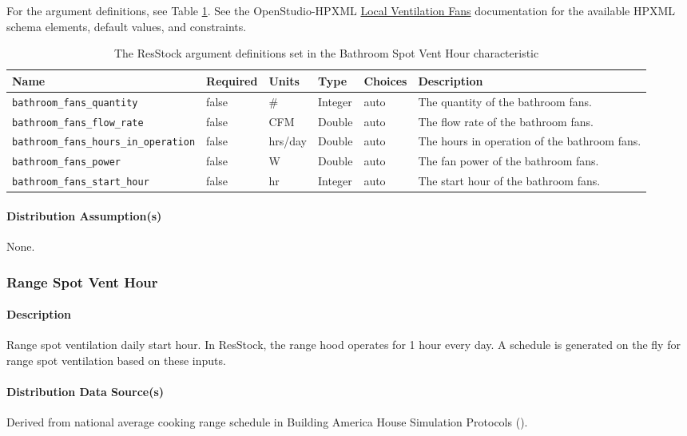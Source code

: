 For the argument definitions, see Table \ref{table:hc_arg_def_bath_vent}. See the OpenStudio-HPXML \href{https://openstudio-hpxml.readthedocs.io/en/v1.8.1/workflow_inputs.html#hpxml-local-ventilation-fans}{Local Ventilation Fans} documentation for the available HPXML schema elements, default values, and constraints.

\begin{longtable}[]{|p{3.5cm}|p{1.5cm}|p{1.3cm}|p{1.1cm}|p{}|p{3.3cm}|} \caption{The ResStock argument definitions set in the Bathroom Spot Vent Hour characteristic} \label{table:hc_arg_def_bath_vent}\\
\toprule\noalign{}
Name & Required & Units & Type & Choices & Description \\
\midrule\noalign{}
\endhead
\bottomrule\noalign{}
\endlastfoot
\texttt{bathroom\_fans\_quantity} & false & \# & Integer & auto & The
quantity of the bathroom fans.  \\
\hline
\texttt{bathroom\_fans\_flow\_rate} & false & CFM & Double & auto & The
flow rate of the bathroom fans.  \\
\hline
\texttt{bathroom\_fans\_hours\_in\_operation} & false & hrs/day & Double
& auto & The hours in operation of the bathroom fans.  \\
\hline
\texttt{bathroom\_fans\_power} & false & W & Double & auto & The fan
power of the bathroom fans. \\
\hline
\texttt{bathroom\_fans\_start\_hour} & false & hr & Integer & auto & The
start hour of the bathroom fans.  \\
\end{longtable}

\paragraph{Distribution Assumption(s)}
None.

\subsubsection{Range Spot Vent Hour} \label{range_spot_vent_hour}
\paragraph{Description}
Range spot ventilation daily start hour. In ResStock, the range hood operates for 1 hour every day. A schedule is generated on the fly for range spot ventilation based on these inputs.

\paragraph{Distribution Data Source(s)}
Derived from national average cooking range schedule in Building America House Simulation Protocols (\cite{Wilson2014}). 
